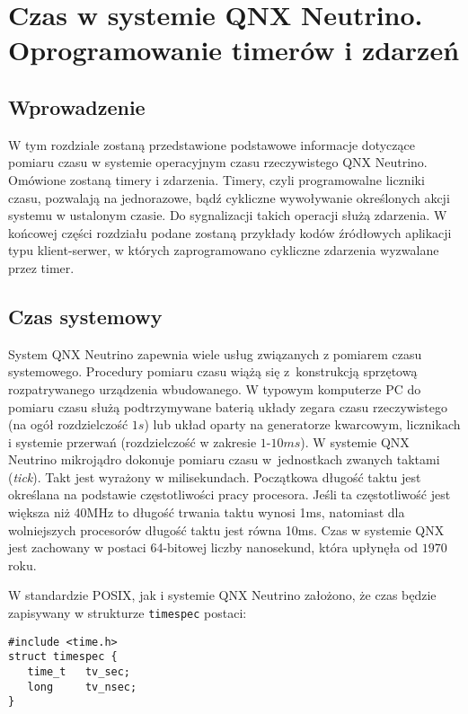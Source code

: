 \section{Czas w systemie QNX Neutrino. Oprogramowanie timerów i zdarzeń}

\subsection{Wprowadzenie}

W tym rozdziale zostaną przedstawione podstawowe informacje dotyczące pomiaru czasu w systemie operacyjnym czasu rzeczywistego QNX Neutrino. Omówione zostaną timery i zdarzenia. Timery, czyli programowalne liczniki czasu, pozwalają na jednorazowe, bądź cykliczne wywoływanie określonych akcji systemu w ustalonym czasie. Do sygnalizacji takich operacji służą zdarzenia. W końcowej części rozdziału podane zostaną przykłady kodów źródłowych aplikacji typu klient-serwer, w których zaprogramowano cykliczne zdarzenia wyzwalane przez timer. 

\subsection{Czas systemowy}

System QNX Neutrino zapewnia wiele usług związanych z pomiarem czasu systemowego. Procedury pomiaru czasu wiążą się z~konstrukcją sprzętową rozpatrywanego urządzenia wbudowanego. W typowym komputerze PC do pomiaru czasu służą podtrzymywane baterią układy zegara czasu rzeczywistego (na ogół rozdzielczość $1s$) lub układ oparty na generatorze kwarcowym, licznikach i systemie przerwań (rozdzielczość w zakresie $1$-$10ms$). W systemie QNX Neutrino mikrojądro dokonuje pomiaru czasu w~jednostkach zwanych taktami (\emph{tick}). Takt jest wyrażony w milisekundach. Początkowa długość taktu jest określana na podstawie częstotliwości pracy procesora. Jeśli ta częstotliwość jest większa niż 40MHz to długość trwania taktu wynosi 1ms, natomiast dla wolniejszych procesorów długość taktu jest równa 10ms. Czas w systemie QNX jest zachowany w postaci 64-bitowej liczby nanosekund, która upłynęła od $1970$ roku. 

W standardzie POSIX, jak i systemie QNX Neutrino założono, że czas będzie zapisywany w strukturze \lstinline[style=MyCStyle]{timespec} postaci: 

\begin{lstlisting}[style=MyCStyle]
#include <time.h>
struct timespec {
   time_t   tv_sec;
   long     tv_nsec;
}
\end{lstlisting}

